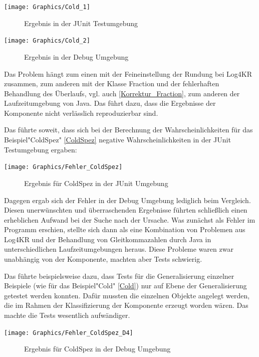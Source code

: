 \documentclass[a4paper, 11pt]{book}
\begin{document}
{\texttt{[image: Graphics/Cold\_1]}
\begin{figure}[h]
	\caption{Ergebnis in der JUnit Testumgebung}
	\label{Cold_1}
\end{figure}

\texttt{[image: Graphics/Cold\_2]}
\begin{figure}[h]
	\caption{Ergebnis in der Debug Umgebung}
	\label{Cold_2}
\end{figure}

Das Problem hängt zum einen mit der Feineinstellung der Rundung bei Log4KR zusammen, zum anderen mit der Klasse Fraction und der fehlerhaften Behandlung des Überlaufs, vgl. auch \ref{Korrektur_Fraction}, zum anderen der Laufzeitumgebung von Java. Das führt dazu, dass die Ergebnisse der Komponente nicht verlässlich reproduzierbar sind.

Das führte soweit, dass sich bei der Berechnung der Wahrscheinlichkeiten für das Beispiel"{}ColdSpez"{} \ref{ColdSpez} negative Wahrscheinlichkeiten in der JUnit Testumgebung ergaben:

\texttt{[image: Graphics/Fehler\_ColdSpez]}
\begin{figure}[h]
	\caption{Ergebnis für ColdSpez in der JUnit Umgebung}
\end{figure}

Dagegen ergab sich der Fehler in der Debug Umgebung lediglich beim Vergleich. Diesen unerwünschten und überraschenden Ergebnisse führten schließlich einen erheblichen Aufwand bei der Suche nach der Ursache. Was zunächst als Fehler im Programm erschien, stellte sich dann als eine Kombination von Problemen aus Log4KR und der Behandlung von Gleitkommazahlen durch Java in unterschiedlichen Laufzeitumgebungen heraus. Diese Probleme waren zwar unabhängig von der Komponente, machten aber Tests schwierig.

Das führte beispielsweise dazu, dass Tests für die Generalisierung einzelner Beispiele (wie für das Beispiel"{}Cold"{} \ref{Cold}) nur auf Ebene der Generalisierung getestet werden konnten. 
Dafür mussten die einzelnen Objekte angelegt werden, die im Rahmen der Klassifizierung der Komponente erzeugt worden wären. Das machte die Tests wesentlich aufwändiger. 


\texttt{[image: Graphics/Fehler\_ColdSpez\_D4]} \label{Fehler_ColdSpez_D4}
\begin{figure}[h]
	\caption{Ergebnis für ColdSpez in der Debug Umgebung}
	
\end{figure}



}
\end{document}
